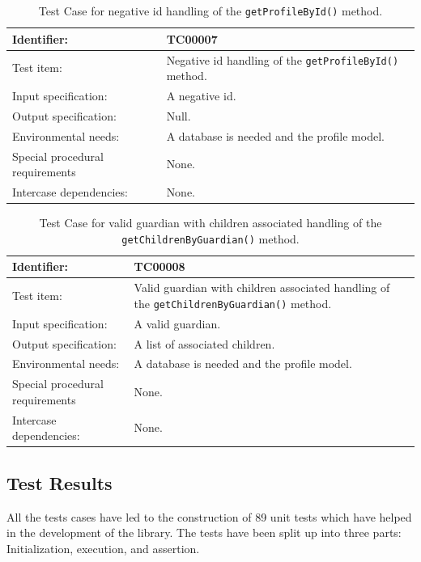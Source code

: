 \begin{table}[htbp]
	\centering
		\begin{tabular}{| p{4.5cm} | m{9cm} |}
			\hline
			Identifier: 					& TC00007 \\ \hline
			Test item:						& Negative id handling of the \texttt{getProfileById()} method. \\ \hline
			Input specification:			& A negative id. \\ \hline
			Output specification: 			& Null. \\ \hline
			Environmental needs:			& A database is needed and the profile model. \\ \hline
			Special procedural requirements	& None. \\ \hline
			Intercase dependencies:			& None. \\ \hline
		\end{tabular}
	\caption{Test Case for negative id handling of the \texttt{getProfileById()} method.}
	\label{tab:TestCase_NegativeIdHandling}
\end{table}

\begin{table}[htbp]
	\centering
		\begin{tabular}{| p{4.5cm} | m{9cm} |}
			\hline
			Identifier: 					& TC00008 \\ \hline
			Test item:						& Valid guardian with children associated handling of the \texttt{getChildrenByGuardian()} method. \\ \hline
			Input specification:			& A valid guardian. \\ \hline
			Output specification: 			& A list of associated children. \\ \hline
			Environmental needs:			& A database is needed and the profile model. \\ \hline
			Special procedural requirements	& None. \\ \hline
			Intercase dependencies:			& None. \\ \hline
		\end{tabular}
	\caption{Test Case for valid guardian with children associated handling of the \texttt{getChildrenByGuardian()} method.}
	\label{tab:TestCase_ValidGuardianWithChildrenAssociatedHandling}
\end{table}

\subsection{Test Results}
All the tests cases have led to the construction of 89 unit tests which have helped in the development of the library.
The tests have been split up into three parts: Initialization, execution, and assertion.


